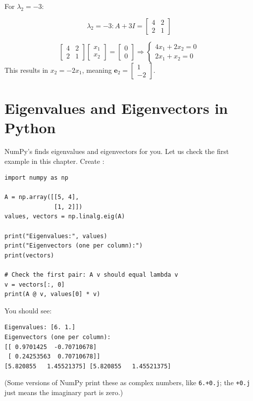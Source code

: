 \begin{Answer}[ref={ex:2x2}]
For $\lambda_2=-3$:

$$\lambda_2 = -3:
A +3I = 
\begin{bmatrix}
4 & 2 \\
2 & 1
\end{bmatrix}
$$

$$\begin{bmatrix}
4 & 2 \\
2 & 1
\end{bmatrix}
\begin{bmatrix}
x_1 \\ x_2
\end{bmatrix}
= 
\begin{bmatrix}
0 \\ 0
\end{bmatrix}
\Rightarrow
\begin{cases}
4x_1 + 2x_2 = 0 \\
2x_1 + x_2 = 0
\end{cases}$$
This results in $x_{2}= -2x_{1}$, meaning $\mathbf e_{2}= \begin{bmatrix}1 \\ -2\end{bmatrix}$.
\end{Answer}
\section{Eigenvalues and Eigenvectors in Python}
NumPy's  finds eigenvalues and eigenvectors for
you. Let us check the first example in this chapter. Create
:

\begin{verbatim}
import numpy as np

A = np.array([[5, 4],
              [1, 2]])
values, vectors = np.linalg.eig(A)

print("Eigenvalues:", values)
print("Eigenvectors (one per column):")
print(vectors)

# Check the first pair: A v should equal lambda v
v = vectors[:, 0]
print(A @ v, values[0] * v)
\end{verbatim}

You should see:
\begin{verbatim}
Eigenvalues: [6. 1.]
Eigenvectors (one per column):
[[ 0.9701425  -0.70710678]
 [ 0.24253563  0.70710678]]
[5.820855   1.45521375] [5.820855   1.45521375]
\end{verbatim}
(Some versions of NumPy print these as complex numbers, like \texttt{6.+0.j};
the \texttt{+0.j} just means the imaginary part is zero.)

